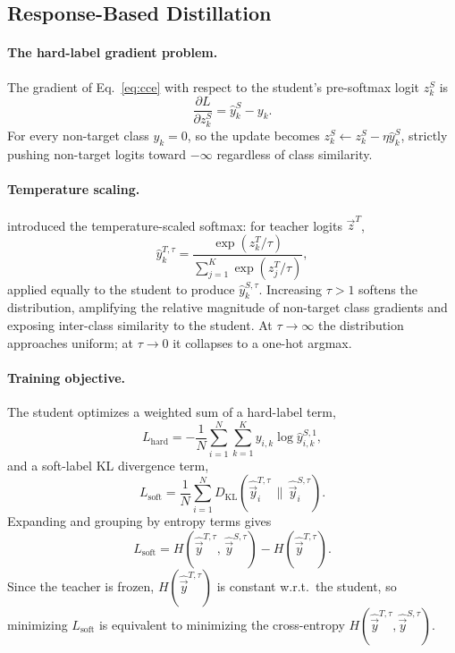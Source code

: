 \documentclass{article}
\theoremstyle{plain}
\theoremstyle{definition}
\theoremstyle{remark}
\begin{document}
\subsection{Response-Based Distillation}
\label{sec:hinton}
\paragraph{The hard-label gradient problem.}
The gradient of Eq.~\eqref{eq:cce} with respect to the student's pre-softmax logit $z_k^S$ is
\begin{equation}
  \frac{\partial L}{\partial z_k^S} = \hat{y}_k^S - y_k.
  \label{eq:cce_grad}
\end{equation}
For every non-target class $y_k = 0$, so the update becomes
$z_k^S \leftarrow z_k^S - \eta\hat{y}_k^S$,
strictly pushing non-target logits toward $-\infty$ regardless 
of class similarity.

\paragraph{Temperature scaling.}
\citet{hinton2015distilling} introduced the temperature-scaled softmax: for teacher logits $\vec{z}^T$,
\begin{equation}
\hat{y}_k^{T,\tau} = \frac{\exp(z_k^T / \tau)}{\sum_{j=1}^K \exp(z_j^T / \tau)},
\label{eq:softtarget}
\end{equation}
applied equally to the student to produce $\hat{y}_k^{S,\tau}$. Increasing $\tau > 1$ softens the distribution, amplifying the relative magnitude of non-target class gradients and exposing inter-class similarity to the student. At $\tau\!\to\!\infty$ the distribution approaches uniform; at $\tau\!\to\!0$ it collapses to a one-hot argmax.

\paragraph{Training objective.}
The student optimizes a weighted sum of a hard-label term,
\begin{equation}
  L_{\mathrm{hard}}
    = -\frac{1}{N}\sum_{i=1}^N\sum_{k=1}^K
        y_{i,k}\log\hat{y}_{i,k}^{S,1},
  \label{eq:lhard}
\end{equation}
and a soft-label KL divergence term,
\begin{equation}
  L_{\mathrm{soft}}
    = \frac{1}{N}\sum_{i=1}^N
        D_{\mathrm{KL}}\!\left(
          \hat{\vec{y}}_i^{T,\tau}
          \,\Big\|\,
          \hat{\vec{y}}_i^{S,\tau}
        \right).
  \label{eq:lsoft}
\end{equation}
Expanding and grouping by entropy terms gives
\begin{equation*}
  L_{\mathrm{soft}} = H(\hat{\vec{y}}^{T,\tau},\,\hat{\vec{y}}^{S,\tau}) - H(\hat{\vec{y}}^{T,\tau}).
\end{equation*}
Since the teacher is frozen, $H(\hat{\vec{y}}^{T,\tau})$ is constant w.r.t.\ the student, so minimizing $L_{\mathrm{soft}}$ is equivalent to minimizing the cross-entropy $H(\hat{\vec{y}}^{T,\tau}, \hat{\vec{y}}^{S,\tau})$.
\end{document}
